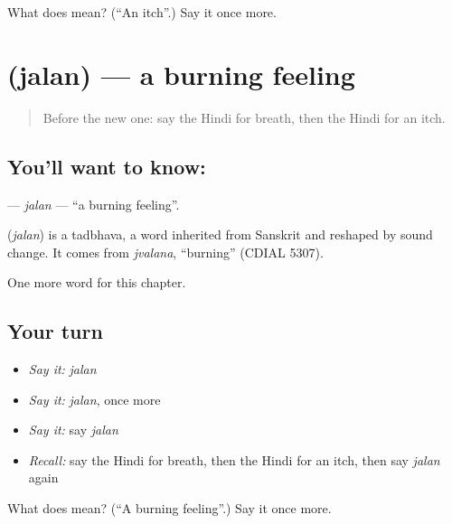\begin{tcolorbox}[breakable,colback=teal!4,colframe=teal!35!black,title={Before you move on}]
What does  mean? (\textquotedblleft{}An itch\textquotedblright{}.) Say it once more.
\end{tcolorbox}
\section[\texorpdfstring{\hi{जलन} (jalan)}{जलन (jalan)}]{ (jalan) — a burning feeling}

\label{lesson:HI-C274-jalan}



\begin{quote}
Before the new one: say the Hindi for breath, then the Hindi for an itch.
\end{quote}

\subsection*{You'll want to know: }
\textbf{} — \emph{jalan} — \textquotedblleft{}a burning feeling\textquotedblright{}.

\begin{cousinweb}
\textbf{} (\emph{jalan}) is a tadbhava, a word inherited from Sanskrit and reshaped by sound change. It comes from \emph{jvalana}, \textquotedblleft{}burning\textquotedblright{} (CDIAL 5307).
\end{cousinweb}

\begin{grammarlens}[title={What you've built}]
One more word for this chapter.
\end{grammarlens}

\subsection*{Your turn}
\begin{itemize}
\raggedright
  \item \emph{Say it:} \emph{jalan}
  \item \emph{Say it:} \emph{jalan}, once more
  \item \emph{Say it:} say \emph{jalan}
  \item \emph{Recall:} say the Hindi for breath, then the Hindi for an itch, then say \emph{jalan} again
\end{itemize}

\begin{tcolorbox}[breakable,colback=teal!4,colframe=teal!35!black,title={Before you move on}]
What does  mean? (\textquotedblleft{}A burning feeling\textquotedblright{}.) Say it once more.
\end{tcolorbox}
